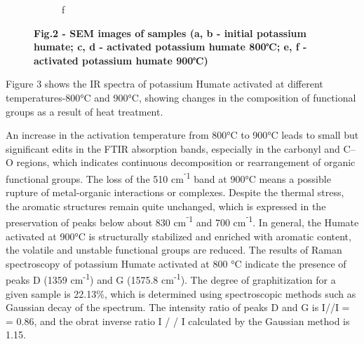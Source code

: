 \begin{figure}[H]
\begin{subfigure}[t]{0.45\textwidth}
        \caption*{f}
    \end{subfigure}
    \caption*{{\bfseries Fig.2 - SEM images of samples (a, b - initial potassium humate; c, d - activated potassium humate 800℃; e, f - activated potassium humate 900℃)}}
\end{figure}

\begin{multicols}{2}
Figure 3 shows the IR spectra of potassium Humate activated at different
temperatures-800°C and 900°C, showing changes in the composition of
functional groups as a result of heat treatment.

An increase in the activation temperature from 800°C to 900°C leads to
small but significant edits in the FTIR absorption bands, especially in
the carbonyl and C--O regions, which indicates continuous decomposition
or rearrangement of organic functional groups. The loss of the 510
cm\textsuperscript{⁻1} band at 900°C means a possible rupture of
metal-organic interactions or complexes. Despite the thermal stress, the
aromatic structures remain quite unchanged, which is expressed in the
preservation of peaks below about 830 cm\textsuperscript{⁻1} and 700
cm\textsuperscript{⁻1}. In general, the Humate activated at 900°C is
structurally stabilized and enriched with aromatic content, the volatile
and unstable functional groups are reduced. The results of Raman
spectroscopy of potassium Humate activated at 800 °C indicate the
presence of peaks D (1359 cm\textsuperscript{-1}) and G (1575.8
cm\textsuperscript{-1}). The degree of graphitization for a given sample
is 22.13\%, which is determined using spectroscopic methods such as
Gaussian decay of the spectrum. The intensity ratio of peaks D and G is
I//I = = 0.86, and the obrat inverse ratio I / / I calculated by the
Gaussian method is 1.15.
\end{multicols}

